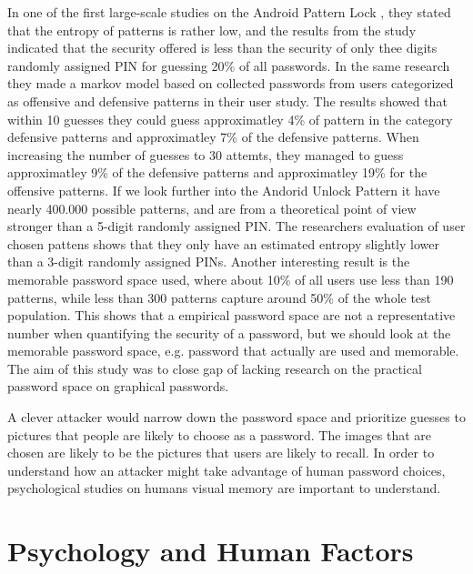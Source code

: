   In one of the first large-scale studies on the Android Pattern Lock \cite{Uellenbeck}, they stated that the entropy of patterns is rather low, and the results from the study indicated that the security offered is less than the security of only thee digits randomly assigned PIN for guessing 20\% of all passwords. In the same research they made a markov model based on collected passwords from users categorized as offensive and defensive patterns in their user study. The results showed that within 10 guesses they could guess approximatley 4\% of pattern in the category defensive patterns and approximatley 7\% of the defensive patterns. When increasing the number of guesses to 30 attemts, they managed to guess approximatley 9\% of the defensive patterns and approximatley 19\% for the offensive patterns. If we look further into the Andorid Unlock Pattern it have nearly 400.000 possible patterns, and are from a theoretical point of view stronger than a 5-digit randomly assigned PIN. The researchers evaluation of user chosen pattens shows that they only have an estimated entropy slightly lower than a 3-digit randomly assigned PINs. Another interesting result is the memorable password space used, where about 10\% of all users use less than 190 patterns, while less than 300 patterns capture around 50\% of the whole test population. This shows that a empirical password space are not a representative number when quantifying the security of a password, but we should look at the memorable password space, e.g. password that actually are used and memorable. The aim of this study was to close gap of lacking research on the practical password space on graphical passwords. 

  A clever attacker would narrow down the password space and prioritize guesses to pictures that people are likely to choose as a password. The images that are chosen are likely to be the pictures that users are likely to recall. In order to understand how an attacker might take advantage of human password choices, psychological studies on humans visual memory are important to understand. 

\clearpage
\section{Psychology and Human Factors}

